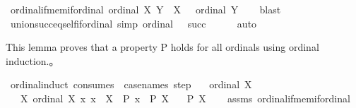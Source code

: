 \begin{isabellebody}
\isadelimproof
%
\endisadelimproof
\isanewline
\isanewline
{}\isamarkupfalse%
\ ordinal{\isacharunderscore}{\kern0pt}if{\isacharunderscore}{\kern0pt}mem{\isacharunderscore}{\kern0pt}if{\isacharunderscore}{\kern0pt}ordinal{\isacharcolon}{\kern0pt}\ {\isachardoublequoteopen}{\isasymlbrakk}ordinal\ X{\isacharsemicolon}{\kern0pt}\ Y\ {\isasymin}\ X{\isasymrbrakk}\ \ {\isasymLongrightarrow}\ ordinal\ Y{\isachardoublequoteclose}\isanewline
%
\isadelimproof
\ \ %
\endisadelimproof
%
\isatagproof
{}\isamarkupfalse%
\ blast%
\endisatagproof
{\isafoldproof}%
%
\isadelimproof
\isanewline
%
\endisadelimproof
\isanewline
{}\isamarkupfalse%
\ union{\isacharunderscore}{\kern0pt}succ{\isacharunderscore}{\kern0pt}eq{\isacharunderscore}{\kern0pt}self{\isacharunderscore}{\kern0pt}if{\isacharunderscore}{\kern0pt}ordinal\ {\isacharbrackleft}{\kern0pt}simp{\isacharbrackright}{\kern0pt}{\isacharcolon}{\kern0pt}\ {\isachardoublequoteopen}ordinal\ {\isasymbeta}\ {\isasymLongrightarrow}\ {\isasymUnion}{\isacharparenleft}{\kern0pt}succ\ {\isasymbeta}{\isacharparenright}{\kern0pt}\ {\isacharequal}{\kern0pt}\ {\isasymbeta}{\isachardoublequoteclose}%
\isadelimproof
\ %
\endisadelimproof
%
\isatagproof
{}\isamarkupfalse%
\ auto%
\endisatagproof
{\isafoldproof}%
%
\isadelimproof
%
\endisadelimproof
%
\begin{isamarkuptext}%
This lemma proves that a property P holds for all ordinals using ordinal induction.。%
\end{isamarkuptext}\isamarkuptrue%
\isamarkupfalse%
\ ordinal{\isacharunderscore}{\kern0pt}induct\ {\isacharbrackleft}{\kern0pt}consumes\ {}{\isacharcomma}{\kern0pt}\ case{\isacharunderscore}{\kern0pt}names\ step{\isacharbrackright}{\kern0pt}{\isacharcolon}{\kern0pt}\isanewline
\ \ \ {\isachardoublequoteopen}ordinal\ X{\isachardoublequoteclose}\isanewline
\ \ \ {\isachardoublequoteopen}{\isasymAnd}X{\isachardot}{\kern0pt}\ {\isasymlbrakk}ordinal\ X{\isacharsemicolon}{\kern0pt}\ {\isasymAnd}x{\isachardot}{\kern0pt}\ x\ {\isasymin}\ X\ {\isasymLongrightarrow}\ P\ x{\isasymrbrakk}\ {\isasymLongrightarrow}\ P\ X{\isachardoublequoteclose}\isanewline
\ \ \ {\isachardoublequoteopen}P\ X{\isachardoublequoteclose}\isanewline
%
\isadelimproof
\ \ %
\endisadelimproof
%
\isatagproof
{}\isamarkupfalse%
\ assms\ ordinal{\isacharunderscore}{\kern0pt}if{\isacharunderscore}{\kern0pt}mem{\isacharunderscore}{\kern0pt}if{\isacharunderscore}{\kern0pt}ordinal\isanewline

\end{isabellebody}
